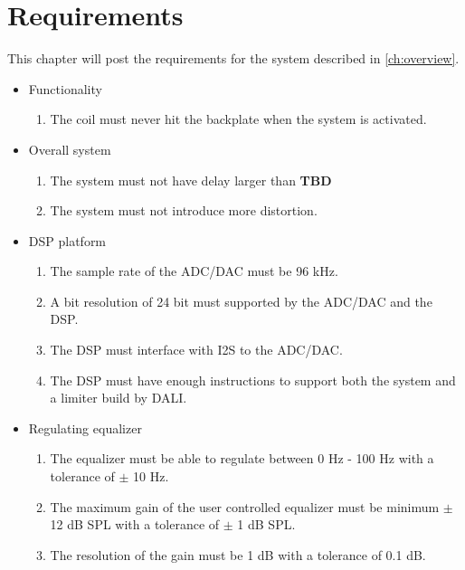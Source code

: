 \chapter{Requirements}
This chapter will post the requirements for the system described in \autoref{ch:overview}.  

\begin{itemize}
\item Functionality
\begin{enumerate}
\item The coil must never hit the backplate when the system is activated.
\end{enumerate}
\end{itemize}

\begin{itemize}
\item Overall system
\begin{enumerate}
\item The system must not have delay larger than \textbf{TBD}
\item The system must not introduce more distortion.
\end{enumerate}
\end{itemize}

\begin{itemize}
\item DSP platform
\begin{enumerate}
\item The sample rate of the ADC/DAC must be 96 kHz.
\item A bit resolution of 24 bit must supported by the ADC/DAC and the DSP.
\item The DSP must interface with \gls{I2S} to the ADC/DAC.
\item The DSP must have enough instructions to support both the system and a limiter build by DALI.  
\end{enumerate}
\end{itemize}

\begin{itemize}
\item Regulating equalizer
\begin{enumerate}
\item The equalizer must be able to regulate between 0 Hz - 100 Hz with a tolerance of $\pm$ 10 Hz. 
\item The maximum gain of the user controlled equalizer must be minimum $\pm$ 12 dB SPL with a tolerance of $\pm$ 1 dB SPL.
\item The resolution of the gain must be 1 dB with a tolerance of 0.1 dB.
\end{enumerate}
\end{itemize}


